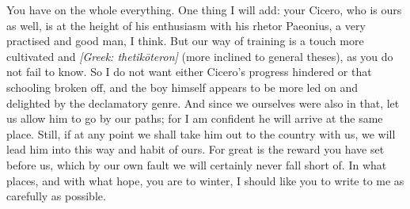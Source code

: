  You have on the whole everything. One thing I will add: your Cicero, who is ours as well, is at the height of his enthusiasm with his rhetor Paeonius, a very practised and good man, I think. But our way of training is a touch more cultivated and \textit{[Greek: thetik\=oteron]} (more inclined to general theses), as you do not fail to know. So I do not want either Cicero's progress hindered or that schooling broken off, and the boy himself appears to be more led on and delighted by the declamatory genre. And since we ourselves were also in that, let us allow him to go by our paths; for I am confident he will arrive at the same place. Still, if at any point we shall take him out to the country with us, we will lead him into this way and habit of ours. For great is the reward you have set before us, which by our own fault we will certainly never fall short of. In what places, and with what hope, you are to winter, I should like you to write to me as carefully as possible.
